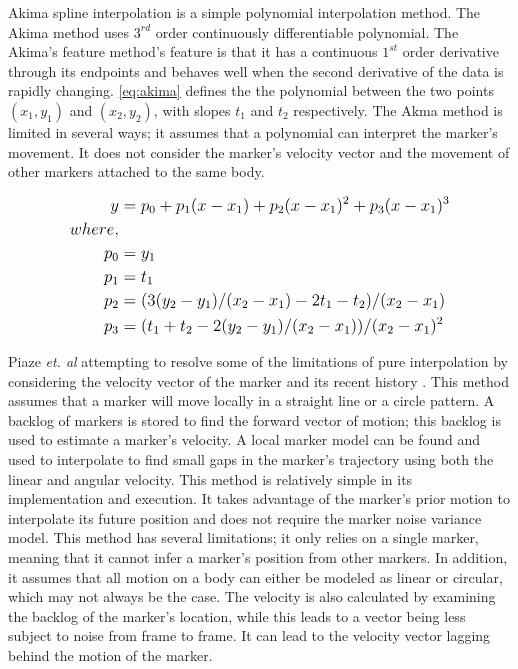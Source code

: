 Akima spline interpolation \cite{wang2014real} is a simple polynomial interpolation method. The Akima method uses $3^{rd}$ order continuously differentiable polynomial. The Akima's feature method's feature is that it has a continuous $1^{st}$  order derivative through its endpoints and behaves well when the second derivative of the data is rapidly changing. \autoref{eq:akima} defines the the polynomial between the two points $(x_{1}, y_{1})$ and $(x_{2}, y_{2})$, with slopes $t_{1}$ and $t_{2}$ respectively. The Akma method is limited in several ways; it assumes that a polynomial can interpret the marker's movement. It does not consider the marker's velocity vector and the movement of other markers attached to the same body. 

\begin{equation} \label{eq:akima}
\large
\begin{split}
        y &= p_{0} + p_{1}(x - x_{1}) + p_{2}(x - x_{1})^{2} + p_{3}(x - x_{1})^{3} \\
        where, \\
          p_{0} &= y_{1} \\
    p_{1} &= t_{1} \\
    p_{2} &= (3(y_{2} - y_{1})/(x_{2} - x_{1}) - 2t_{1} - t_{2})/(x_{2} - x_{1}) \\
    p_{3} &= (t_{1} + t_{2} - 2(y_{2} - y_{1})/(x_{2} - x_{1}))/(x_{2} - x_{1})^{2}
\end{split}
\end{equation}

Piaze \textit{et. al} attempting to resolve some of the limitations of pure interpolation by considering the velocity vector of the marker and its recent history \cite{piazza2009towards}. This method assumes that a marker will move locally in a straight line or a circle pattern. A backlog of markers is stored to find the forward vector of motion; this backlog is used to estimate a marker's velocity. A local marker model can be found and used to interpolate to find small gaps in the marker's trajectory using both the linear and angular velocity. This method is relatively simple in its implementation and execution. It takes advantage of the marker's prior motion to interpolate its future position and does not require the marker noise variance model. This method has several limitations; it only relies on a single marker, meaning that it cannot infer a marker's position from other markers. In addition, it assumes that all motion on a body can either be modeled as linear or circular, which may not always be the case. The velocity is also calculated by examining the backlog of the marker's location, while this leads to a vector being less subject to noise from frame to frame. It can lead to the velocity vector lagging behind the motion of the marker. 

